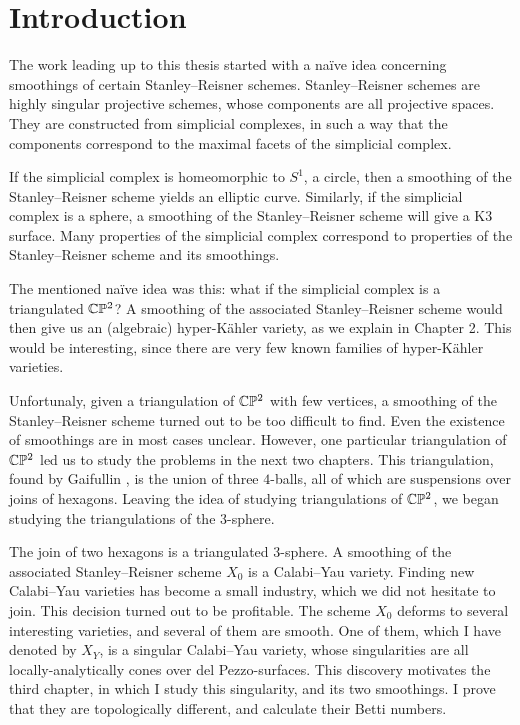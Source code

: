 \chapter{Introduction}
\label{sec:intro}

The work leading up to this thesis started with a naïve idea concerning smoothings of certain Stanley--Reisner schemes. Stanley--Reisner schemes are highly singular projective schemes, whose components are all projective spaces. They are constructed from simplicial complexes, in such a way that the components correspond to the maximal facets of the simplicial complex. 

If the simplicial complex is homeomorphic to $S^1$, a circle, then a smoothing of the Stanley--Reisner scheme yields an elliptic curve. Similarly, if the simplicial complex is a sphere, a smoothing of the Stanley--Reisner scheme will give a K3 surface. Many properties of the simplicial complex correspond to properties of the Stanley--Reisner scheme and its smoothings. 

The mentioned naïve idea was this: what if the simplicial complex is a triangulated $\mathbb{C} \mathbb{P}^2$? A smoothing of the associated Stanley--Reisner scheme would then give us an (algebraic) hyper-Kähler variety, as we explain in Chapter 2. This would be interesting, since there are very few known families of hyper-Kähler varieties.

Unfortunaly, given a triangulation of $\mathbb{C} \mathbb{P}^2$ with few vertices, a smoothing of the Stanley--Reisner scheme turned out to be too difficult to find. Even the existence of smoothings are in most cases unclear. However, one particular triangulation of $\mathbb{C} \mathbb{P}^2$ led us to study the problems in the next two chapters. This triangulation, found by Gaifullin \cite{cp2_15_chess}, is the union of three $4$-balls, all of which are suspensions over joins of hexagons. Leaving the idea of studying triangulations of $\mathbb{C} \mathbb{P}^2$, we began studying the triangulations of the $3$-sphere.

The join of two hexagons is a triangulated $3$-sphere. A smoothing of the associated Stanley--Reisner scheme $X_0$ is a Calabi--Yau variety. Finding new Calabi--Yau varieties has become a small industry, which we did not hesitate to join. This decision turned out to be profitable. The scheme $X_0$ deforms to several interesting varieties, and several of them are smooth. One of them, which I have denoted by $X_Y$, is a singular Calabi--Yau variety, whose singularities are all locally-analytically cones over del Pezzo-surfaces. This discovery motivates the third chapter, in which I study this singularity, and its two smoothings. I prove that they are topologically different, and calculate their Betti numbers.

